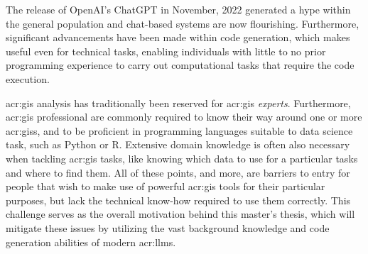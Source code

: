 \begin{comment}
Having a template to work from provides a starting point.
However, for a given project, a slight variation in the template may be required due to the nature of the given project.
Furthermore, the order in which the various chapters and sections will be written will also vary from project to project,
but the writing will seldom start at the abstract and sequentially follow the chapters of the report.
One critical reason for this is that you need to start writing as early as possible and that you will begin to write up where you are currently focusing.
However, do not leave working on the abstract until the very last days. The abstract is the first thing anyone reads of an article or thesis --- after the title;
and thus it is important that it is very well written. Abstracts are hard to write, so create revisions throughout the course of your project.

The background and motivation here should state where your project is situated in the field and what the key driving forces motivating this research are.
However, keep this section brief, as it is still part of the introduction.
The motivation will be further elaborated on in Chapter~\ref{cha:related_work}, presenting your complete state-of-the-art.

Note that this template uses italics to highlight where Latin wording is inserted to represent text and the text of the template
that we wish to draw your attention to. The italics themselves are not an indication that such sections should use italics.

\end{comment}

The release of OpenAI's ChatGPT in November, 2022 \citep{openaiIntroducingChatGPT2022} generated a hype within the general population and chat-based systems are now flourishing. Furthermore, significant advancements have been made within code generation, which makes  useful even for technical tasks, enabling individuals with little to no prior programming experience to carry out computational tasks that require the code execution.

\gls{acr:gis} analysis has traditionally been reserved for \acrshort{acr:gis} \textit{experts}. Furthermore, \acrshort{acr:gis} professional are commonly required to know their way around one or more \glspl{acr:gis}, and to be proficient in programming languages suitable to data science task, such as Python or R. Extensive domain knowledge is often also necessary when tackling \acrshort{acr:gis} tasks, like knowing which data to use for a particular tasks and where to find them. All of these points, and more, are barriers to entry for people that wish to make use of powerful \acrshort{acr:gis} tools for their particular purposes, but lack the technical know-how required to use them correctly. This challenge serves as the overall motivation behind this master's thesis, which will mitigate these issues by utilizing the vast background knowledge and code generation abilities of modern \glspl{acr:llm}.

